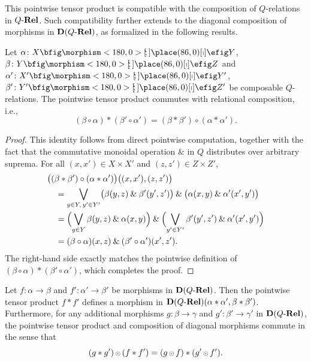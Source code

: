\documentclass{tac}
\begin{document}
This pointwise tensor product is compatible with the composition of $Q$-relations in $Q\text{-}\mathbf{Rel}$. Such compatibility further extends to the diagonal composition of morphisms in ${\mathbf{D}(Q\text{-}\mathbf{Rel})}$, as formalized in the following results.

\begin{proposition}\label{prop:tensor-compat}
Let $\alpha\colon X\nto Y$, $\beta\colon Y\nto Z$ and $\alpha'\colon X'\nto Y'$, $\beta'\colon Y'\nto Z'$ be composable $Q$-relations. The pointwise tensor product commutes with relational composition, i.e.,
\[
(\beta\circ\alpha)*(\beta'\circ\alpha')
=(\beta*\beta')\circ(\alpha*\alpha').
\]
\end{proposition}

\begin{proof}
This identity follows from direct pointwise computation, together with the fact that the commutative monoidal operation $\&$ in $Q$ distributes over arbitrary suprema. For all $(x,x')\in X\times X'$ and $(z,z')\in Z\times Z'$,
\[
\begin{aligned}
&\bigl((\beta*\beta')\circ(\alpha*\alpha')\bigr)\bigl((x,x'),(z,z')\bigr)\\
&\quad=\bigvee_{y\in Y,\,y'\in Y'}
\bigl(\beta(y,z)\mathbin{\&}\beta'(y',z')\bigr)
\mathbin{\&}\bigl(\alpha(x,y)\mathbin{\&}\alpha'(x',y')\bigr)\\
&\quad=\Bigl(\bigvee_{y\in Y}\beta(y,z)\mathbin{\&}\alpha(x,y)\Bigr)
\mathbin{\&}\Bigl(\bigvee_{y'\in Y'}\beta'(y',z')\mathbin{\&}\alpha'(x',y')\Bigr)\\
&\quad=(\beta\circ\alpha)(x,z)\mathbin{\&}(\beta'\circ\alpha')(x',z').
\end{aligned}
\]
The right-hand side exactly matches the pointwise definition of $(\beta\circ\alpha)*(\beta'\circ\alpha')$, which completes the proof.
\end{proof}

\begin{proposition}\label{prop:tensor-diag-compat}
Let \(f\colon\alpha\to\beta\) and \(f'\colon\alpha'\to\beta'\) be morphisms in \({\mathbf{D}(Q\text{-}\mathbf{Rel})}\). Then the pointwise tensor product \(f\ast f'\) defines a morphism in \({\mathbf{D}(Q\text{-}\mathbf{Rel})}(\alpha\ast\alpha',\beta\ast\beta')\). Furthermore, for any additional morphisms \(g\colon\beta\to\gamma\) and \(g'\colon\beta'\to\gamma'\) in \({\mathbf{D}(Q\text{-}\mathbf{Rel})}\), the pointwise tensor product and composition of diagonal morphisms commute in the sense that
    \[
    (g\ast g'){\,{\scriptstyle\odot}\,} (f\ast f')=(g{\,{\scriptstyle\odot}\,} f)\ast(g'{\,{\scriptstyle\odot}\,} f').
    \]
\end{proposition}
    
\end{document}
